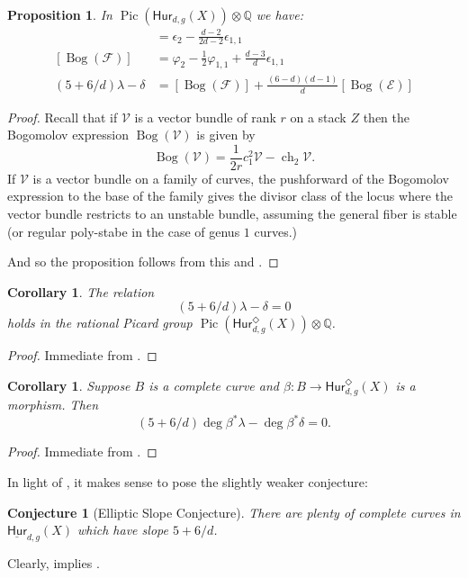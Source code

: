 \documentclass[reqno, 11pt]{amsart}
\newtheorem{proposition}[theorem]{Proposition}
\newtheorem{corollary}[theorem]{Corollary}
\newtheorem{conjecture}[theorem]{Conjecture}
\DeclareMathOperator{\Pic}{Pic}
\newcommand{\HdgX}{\mathsf{Hur}_{d,g}(X)}
\DeclareMathOperator{\ch}{ch}
\newcommand{\St}{\mathsf{Hur}_{d,g}^{\Diamond}(X)}
\DeclareMathOperator{\Bog}{Bog}
\newcommand{\Hurfixed}[2]{\underline{\mathsf{Hur}}_{#1,#2}}
\begin{document}
\begin{proposition}
    \label{proposition:bogomolov} In $\Pic (\HdgX) \otimes \mathbb{Q}$ we have: 
    \begin{align}
        [\Bog(\mathcal{E})] &=  \epsilon_2 -  \frac{d-2}{2d-2} \epsilon_{1,1}\\
        [\Bog(\mathcal{F})] &=  \varphi_{2} - \frac{1}{2}\varphi_{1,1} + \frac{d-3}{d}\epsilon_{1,1}\\
        (5+6/d)\lambda - \delta &= [\Bog(\mathcal{F})] + \frac{(6-d)(d-1)}{d}[\Bog(\mathcal{E})]
    \end{align}
\end{proposition}

\begin{proof}
    Recall that if $\mathcal{V}$ is a vector bundle of rank $r$ on a stack $Z$ then the Bogomolov expression $\Bog(\mathcal{V})$ is given by \[\Bog(\mathcal{V}) = \frac{1}{2r}c_{1}^{2}\mathcal{V} - \ch_{2}\mathcal{V}.\] 
    If $\mathcal{V}$ is a vector bundle on a family of curves, the pushforward of the Bogomolov expression to the base of the family gives the divisor class of the locus where the vector bundle restricts to an unstable bundle, assuming the general fiber is stable (or regular poly-stabe in the case of genus $1$ curves.) 

    And so the proposition follows from this and .
\end{proof}


\begin{corollary}
    \label{theorem:5plus6d}  The relation 
    \[(5+6/d) \lambda - \delta = 0\] holds in the rational Picard group $\Pic(\St) \otimes \mathbb{Q}$.
\end{corollary} 


\begin{proof}
    Immediate from .
\end{proof}

\begin{corollary}
    \label{corollary:slope} Suppose $B$ is a complete curve and $\beta: B \to \St$ is a morphism. Then \[(5+6/d) \deg \beta^{*} \lambda - \deg \beta^{*} \delta = 0.\]
\end{corollary}

\begin{proof}
    Immediate from .
\end{proof}

In light of , it makes sense to pose the slightly weaker conjecture: 
\begin{conjecture}[Elliptic Slope Conjecture]
    \label{conjecture:completeslope} There are plenty of complete curves in $\Hurfixed{d}{g}(X)$ which have slope $5+6/d$.
\end{conjecture}
Clearly,  implies .
\end{document}
